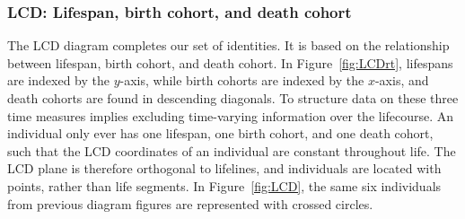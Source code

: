 \documentclass[12pt,oneside,a4paper]{article} %
\newcommand\tgh[1]{\raisebox{-.25\height}{\texttt{[image: Figures/triadtable/triad\#1.pdf]}}}
\begin{document}
\FloatBarrier
\subsubsection{LCD: Lifespan, birth cohort, and death cohort}%
\FloatBarrier

The LCD diagram completes our set of identities. It is based on the relationship
between lifespan, birth cohort, and death cohort. In
Figure~\ref{fig:LCDrt}, lifespans are indexed by the $y$-axis, while birth cohorts are indexed by the $x$-axis, and death cohorts
are found in descending diagonals. To structure data on these three
time measures implies excluding time-varying information over the lifecourse.
An individual
only ever has one lifespan, one birth cohort, and one death cohort, such that
the LCD coordinates of an individual are constant throughout life.
The LCD plane is therefore orthogonal to lifelines, and individuals are located
with points, rather than life segments.
In Figure~\ref{fig:LCD}, the same six individuals from previous diagram figures are represented with crossed circles.
\end{document}
